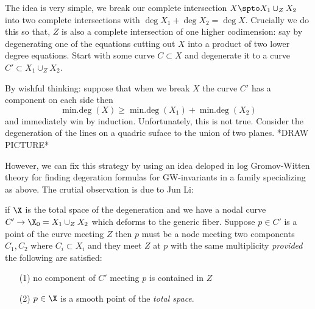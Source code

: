 \documentclass[12pt]{article}
\theoremstyle{plain}
\DeclareMathOperator{\mindeg}{min.deg}
\begin{document}
The idea is very simple, we break our complete intersection $X \spto X_1 \cup_Z X_2$ into two complete intersections with $\deg{X_1} + \deg{X_2} = \deg{X}$. {\color{red} Crucially we do this so that, $Z$ is also a complete intersection of one higher codimension: say by degenerating one of the equations cutting out $X$ into a product of two lower degree equations.} Start with some curve $C \subset X$ and degenerate it to a curve $C' \subset X_1 \cup_Z X_2$.
\par 
By wishful thinking: suppose that when we break $X$ the curve $C'$ has a component on each side then
\[ \mindeg(X) \ge \mindeg(X_1) + \mindeg(X_2) \]
and immediately win by induction. {\color{red} Unfortunately, this is not true. Consider the degeneration of the lines on a quadric suface to the union of two planes. *DRAW PICTURE*}
\par 
However, we can fix this strategy by using an idea deloped in log Gromov-Witten theory for finding degeration formulas for GW-invariants in a family specializing as above. The crutial observation is due to Jun Li:

if $\X$ is the total space of the degeneration and we have a nodal curve $C' \to \X_0 = X_1 \cup_Z X_2$ which deforms to the generic fiber. Suppose $p \in C'$ is a point of the curve meeting $Z$ then $p$ must be a node meeting two components $C_1, C_2$ where $C_i \subset X_i$ and they meet $Z$ at $p$ with the same multiplicity \textit{provided} the following are satisfied:
\begin{enumerate}
\item[(1)] no component of $C'$ meeting $p$ is contained in $Z$
\item[(2)] $p \in \X$ is a smooth point of the \textit{total space}.
\end{enumerate}
 
\end{document}

